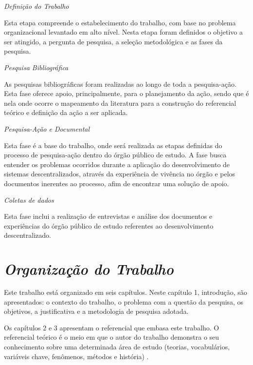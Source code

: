 \textit{Definição do Trabalho}

Esta etapa compreende o estabelecimento do trabalho, com base no problema
organizacional levantado em alto nível. Nesta etapa foram definidos o objetivo a ser atingido, a pergunta de pesquisa, a seleção metodológica e as fases da pesquisa.

\textit{Pesquisa Bibliográfica}

As pesquisas bibliográficas foram realizadas ao longo de toda a pesquisa-ação. Esta fase oferece apoio, principalmente, para o planejamento da ação, sendo que é nela onde ocorre o mapeamento da literatura para a construção do referencial teórico e definição da ação a ser aplicada.

\textit{Pesquisa-Ação e Documental}

Esta fase é a base do trabalho, onde será realizada as etapas definidas do processo de pesquisa-ação dentro do órgão público de estudo. A fase busca entender os problemas ocorridos durante a aplicação do desenvolvimento de sistemas descentralizados, através da experiência de vivência no órgão e pelos documentos inerentes ao processo, afim de encontrar uma solução de apoio.

\textit{Coletas de dados}

Esta fase inclui a realização de entrevistas e análise dos documentos e experiências do órgão público de estudo referentes ao desenvolvimento descentralizado.

\section{\textit{Organização do Trabalho}}

Este trabalho está organizado em seis capítulos. Neste capítulo 1, introdução, são
apresentados: o contexto do trabalho, o problema com a questão da pesquisa, os
objetivos, a justificativa e a metodologia de pesquisa adotada.

Os capítulos 2 e 3 apresentam o referencial que embasa este trabalho. O referencial teórico é o meio em que o autor do trabalho demonstra o seu conhecimento sobre uma determinada área de estudo (teorias, vocabulários, variáveis chave, fenômenos, métodos e história) \cite{randolph2009}.

